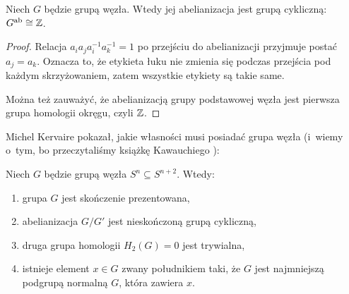 \begin{comment}
\begin{figure}[H]
    \begin{minipage}[b]{.48\linewidth}
        \[
            \HugeWirtingerPlus
        \]
        \subcaption{skrzyżowanie dodatnie: $x_j = x_k x_{j+1} x_k^{-1}$}
    \end{minipage}
    \begin{minipage}[b]{.48\linewidth}
        \[
            \HugeWirtingerMinus
        \]
        \subcaption{skrzyżowanie ujemne: $x_j = x_k^{-1} x_{j+1} x_k$}
    \end{minipage}
\end{figure}
\end{comment}

\begin{corollary}
    Niech $G$ będzie grupą węzła.
    Wtedy jej abelianizacja jest grupą cykliczną: $G^{\operatorname{ab}} \cong \mathbb Z$.
\end{corollary}

\begin{proof}
    Relacja $a_ia_ja_i^{-1}a_k^{-1}=1$ po przejściu do abelianizacji przyjmuje postać $a_j = a_k$.
    Oznacza to, że etykieta łuku nie zmienia się podczas przejścia pod każdym skrzyżowaniem, zatem wszystkie etykiety są takie same.

    Można też zauważyć, że abelianizacją grupy podstawowej węzła jest pierwsza grupa homologii okręgu, czyli $\mathbb Z$.
\end{proof}

Michel Kervaire \cite{kervaire1965} pokazał, jakie własności musi posiadać grupa węzła (i~wiemy o~tym, bo przeczytaliśmy książkę Kawauchiego \cite[tw. 14.1.1]{kawauchi1996}):
%

\begin{proposition}
%
%
    Niech $G$ będzie grupą węzła $S^n \subseteq S^{n+2}$.
    Wtedy:
    \begin{enumerate}
        \item grupa $G$ jest skończenie prezentowana,
        \item abelianizacja $G/G'$ jest nieskończoną grupą cykliczną,
        \item druga grupa homologii $H_2(G) = 0$ jest trywialna,
        \item istnieje element $x \in G$ zwany południkiem taki, że $G$ jest najmniejszą podgrupą normalną $G$, która zawiera $x$.
    \end{enumerate}
\end{proposition}

